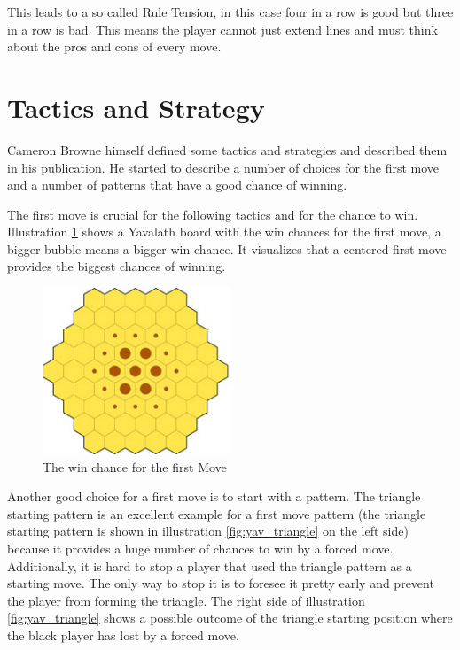 \documentclass[english]{report} \usepackage[english]{babel}
\begin{document}
This leads to a so called Rule Tension, in this case four in a row is good but
three in a row is bad. This means the player cannot just extend lines and must
think about the pros and cons of every move.\cite{yvalath}

\section{Tactics and Strategy}
Cameron Browne himself defined some tactics and strategies and described them in
his publication. He started to describe a number of choices for the first move
and a number of patterns that have a good chance of winning.


The first move is crucial for the following tactics and for the chance to win.
Illustration \ref{fig:yav_winChance} shows a Yavalath board with the win chances
for the first move, a bigger bubble means a bigger win chance. It visualizes
that a centered first move provides the biggest chances of
winning.\cite{yvalath}


\begin{figure}[H]
\centering
\includegraphics[width=0.5\textwidth]{Abbildungen/yav_winChance.png}
\caption[The chances of winning for the first Move, Source:\cite{yvalath}]{The win chance for the first Move}
\label{fig:yav_winChance}
\end{figure}


Another good choice for a first move is to start with a pattern. The triangle
starting pattern is an excellent example for a first move pattern (the triangle
starting pattern is shown in illustration \ref{fig:yav_triangle} on the left
side) because it provides a huge number of chances to win by a forced move.
Additionally, it is hard to stop a player that used the triangle pattern as a
starting move. The only way to stop it is to foresee it pretty early and prevent
the player from forming the triangle.
The right side of illustration \ref{fig:yav_triangle} shows a possible outcome
of the triangle starting position where the black player has lost by a forced
move.\cite{yvalath}
\end{document}
